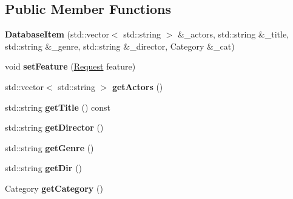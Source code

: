 \subsection*{Public Member Functions}
\begin{DoxyCompactItemize}
\item 
\mbox{\label{classDatabaseItem_ae95a9411ad019fc6e219394162186f77}} 
{\bfseries Database\+Item} (std\+::vector$<$ std\+::string $>$ \&\+\_\+actors, std\+::string \&\+\_\+title, std\+::string \&\+\_\+genre, std\+::string \&\+\_\+director, Category \&\+\_\+cat)
\item 
\mbox{\label{classDatabaseItem_a730ed715f53f019df31a66a8d734137f}} 
void {\bfseries set\+Feature} (\hyperlink{classRequest}{Request} feature)
\item 
\mbox{\label{classDatabaseItem_a98560961c4ab1266fe9b10f094bea568}} 
std\+::vector$<$ std\+::string $>$ {\bfseries get\+Actors} ()
\item 
\mbox{\label{classDatabaseItem_a87f2ebf677aaec4bc2e95eea2b7bd329}} 
std\+::string {\bfseries get\+Title} () const
\item 
\mbox{\label{classDatabaseItem_a7edc61bf54ac2e48e921b9948d9efecb}} 
std\+::string {\bfseries get\+Director} ()
\item 
\mbox{\label{classDatabaseItem_ac1d9f64c889ed271aa0f586a62a2c82a}} 
std\+::string {\bfseries get\+Genre} ()
\item 
\mbox{\label{classDatabaseItem_afcca0a554ac65bdcf796480e8d2920f4}} 
std\+::string {\bfseries get\+Dir} ()
\item 
\mbox{\label{classDatabaseItem_a0a2d0572bd7bbbf602120cf33c195b20}} 
Category {\bfseries get\+Category} ()
\end{DoxyCompactItemize}
